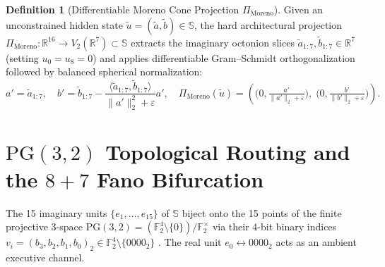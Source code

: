 \documentclass[11pt,a4paper]{article}
\theoremstyle{definition}
\newtheorem{definition}[theorem]{Definition}
\theoremstyle{remark}
\newcommand{\R}{\mathbb{R}}
\newcommand{\Se}{\mathbb{S}}
\newcommand{\Ftwo}{\mathbb{F}_2}
\newcommand{\PG}{\mathrm{PG}}
\newcommand{\PiMoreno}{\Pi_{\mathrm{Moreno}}}
\begin{document}
\begin{definition}[Differentiable Moreno Cone Projection $\PiMoreno$]
Given an unconstrained hidden state $\tilde{u} = (\tilde{a}, \tilde{b}) \in \Se$, the hard architectural projection $\PiMoreno : \R^{16} \to V_2(\R^7) \subset \Se$ extracts the imaginary octonion slices $\tilde{a}_{1:7}, \tilde{b}_{1:7} \in \R^7$ (setting $u_0 = u_8 = 0$) and applies differentiable Gram--Schmidt orthogonalization followed by balanced spherical normalization:
\begin{equation}
\label{eq:moreno_proj}
a' = \tilde{a}_{1:7}, \quad b' = \tilde{b}_{1:7} - \frac{\langle \tilde{a}_{1:7}, \tilde{b}_{1:7} \rangle}{\|a'\|_2^2 + \varepsilon} a', \quad \PiMoreno(\tilde{u}) = \left( \big(0, \tfrac{a'}{\|a'\|_2 + \varepsilon}\big), \; \big(0, \tfrac{b'}{\|b'\|_2 + \varepsilon}\big) \right).
\end{equation}
\end{definition}

\section{$\PG(3,2)$ Topological Routing and the $8+7$ Fano Bifurcation}
\label{sec:wp2}

The 15 imaginary units $\{e_1, \dots, e_{15}\}$ of $\Se$ biject onto the 15 points of the finite projective 3-space $\PG(3,2) = (\Ftwo^4 \setminus \{0\}) / \Ftwo^\times$ via their 4-bit binary indices $v_i = (b_3, b_2, b_1, b_0)_2 \in \Ftwo^4 \setminus \{0000_2\}$ \cite{Agourakis2026a}. The real unit $e_0 \leftrightarrow 0000_2$ acts as an ambient executive channel.
\end{document}
